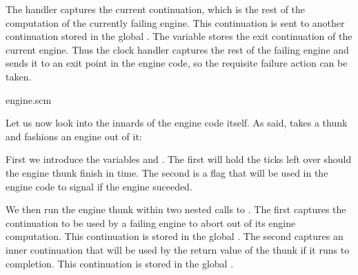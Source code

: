 The handler captures the current continuation, which is
the rest of the computation of the currently failing
engine.  This continuation is sent to another
continuation stored in the global .
The  variable stores the exit
continuation of the current engine.  Thus the clock
handler captures the rest of the failing engine and
sends it to an exit point in the engine code, so the
requisite failure action can be taken.

\scmfilename engine.scm


Let us now look into the innards of the engine code
itself.  As said,  takes a thunk and
fashions an engine out of it:


\n First we introduce the variables 
and .  The first will hold
the ticks left over should the engine thunk finish
in time.  The second is a flag that will be used in
the engine code to signal if the engine suceeded.

We then run the engine thunk within two nested calls to
.  The first  captures the
continuation to be used by a failing engine to abort
out of its engine computation.  This continuation is
stored in the global .  The second
 captures an inner continuation that
will be used by the return value of the thunk  if
it runs to completion.  This continuation is stored
in the global
.

